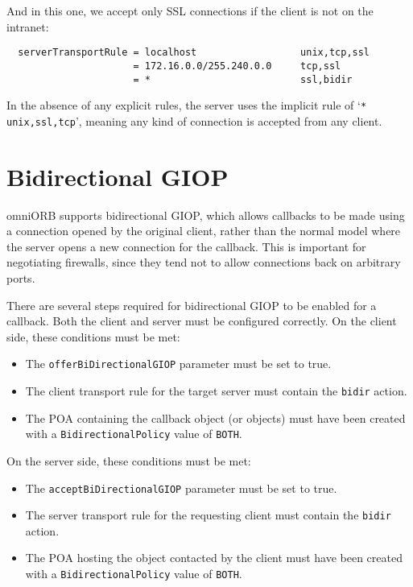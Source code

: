\documentclass[11pt,twoside,a4paper]{book}
\newcommand{\code}[1]{\texttt{#1}}
\newcommand{\dsc}{\discretionary{}{}{}}
\begin{document}
\noindent And in this one, we accept only SSL connections if the
client is not on the intranet:

\begin{verbatim}
  serverTransportRule = localhost                  unix,tcp,ssl
                      = 172.16.0.0/255.240.0.0     tcp,ssl
                      = *                          ssl,bidir
\end{verbatim}

\noindent In the absence of any explicit rules, the server uses the
implicit rule of `\code{* unix,\dsc{}ssl,tcp}', meaning any kind of
connection is accepted from any client.


\section{Bidirectional GIOP}
\label{sec:bidir}

omniORB supports bidirectional GIOP, which allows callbacks to be made
using a connection opened by the original client, rather than the
normal model where the server opens a new connection for the callback.
This is important for negotiating firewalls, since they tend not to
allow connections back on arbitrary ports.

There are several steps required for bidirectional GIOP to be enabled
for a callback. Both the client and server must be configured
correctly. On the client side, these conditions must be met:

\begin{itemize}

\item The \code{offerBiDirectionalGIOP} parameter must be set to true. 
\item The client transport rule for the target server must contain the
      \code{bidir} action.
\item The POA containing the callback object (or objects) must have
      been created with a \code{BidirectionalPolicy} value of
      \code{BOTH}.

\end{itemize}

\noindent On the server side, these conditions must be met:

\begin{itemize}

\item The \code{acceptBiDirectionalGIOP} parameter must be set to true. 
\item The server transport rule for the requesting client must contain
      the \code{bidir} action.
\item The POA hosting the object contacted by the client must have
      been created with a \code{BidirectionalPolicy} value of
      \code{BOTH}.

\end{itemize}
\end{document}

